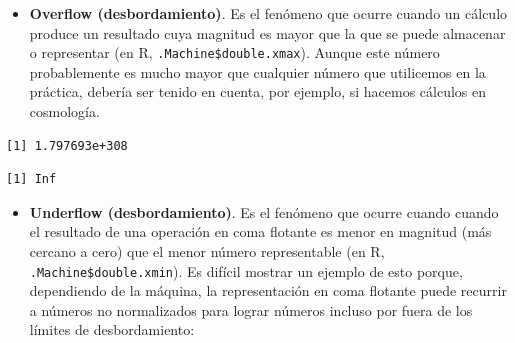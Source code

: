 \documentclass[openany]{book}
\newenvironment{Shaded}{\begin{snugshade}}{\end{snugshade}}
\newcommand{\CommentTok}[1]{\textcolor[rgb]{0.56,0.35,0.01}{\textit{#1}}}
\newcommand{\DecValTok}[1]{\textcolor[rgb]{0.00,0.00,0.81}{#1}}
\newcommand{\NormalTok}[1]{#1}
\newcommand{\OperatorTok}[1]{\textcolor[rgb]{0.81,0.36,0.00}{\textbf{#1}}}
\newcommand{\StringTok}[1]{\textcolor[rgb]{0.31,0.60,0.02}{#1}}
\providecommand{\tightlist}{%
  \setlength{\itemsep}{0pt}\setlength{\parskip}{0pt}}
\begin{document}
\begin{itemize}
\tightlist
\item
  \textbf{Overflow (desbordamiento)}. Es el fenómeno que ocurre cuando un cálculo produce un resultado cuya magnitud es mayor que la que se puede almacenar o representar (en R, \texttt{.Machine\$double.xmax}). Aunque este número probablemente es mucho mayor que cualquier número que utilicemos en la práctica, debería ser tenido en cuenta, por ejemplo, si hacemos cálculos en cosmología.
\end{itemize}

\begin{Shaded}
\end{Shaded}

\begin{verbatim}
[1] 1.797693e+308
\end{verbatim}

\begin{Shaded}
\end{Shaded}

\begin{verbatim}
[1] Inf
\end{verbatim}

\begin{itemize}
\tightlist
\item
  \textbf{Underflow (desbordamiento)}. Es el fenómeno que ocurre cuando cuando el resultado de una operación en coma flotante es menor en magnitud (más cercano a cero) que el menor número representable (en R, \texttt{.Machine\$double.xmin}). Es difícil mostrar un ejemplo de esto porque, dependiendo de la máquina, la representación en coma flotante puede recurrir a números no normalizados para lograr números incluso por fuera de los límites de desbordamiento:
\end{itemize}

\begin{Shaded}
\end{Shaded}
\end{document}
